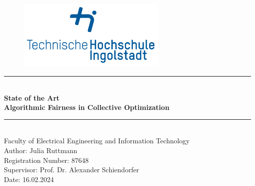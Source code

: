 \documentclass[german, a4paper, 11pt, oneside]{scrbook}
\begin{document}
\thispagestyle{empty}
\begin{figure}[t]
 \centering
 \includegraphics[height=3.4cm, trim=1.2cm 1.2cm 1.2cm 1.2cm]{thi_logo}
\end{figure}
\begin{center}
\vspace*{2cm}

\vspace*{2cm}
\par\noindent\rule{\textwidth}{0.2pt}
\\
\vspace*{0.5cm}
{\huge \textbf{State of the Art}}\\
{\LARGE \textbf{Algorithmic Fairness in Collective Optimization}}
\par\noindent\rule{\textwidth}{0.2pt}
\\
\vspace*{2cm}
{\huge Faculty of Electrical Engineering and Information Technology}
\\
\vspace*{2cm}
{\LARGE Author: Julia Ruttmann \\Registration Number: 87648\\Supervisor: Prof. Dr. Alexander Schiendorfer\\}
\vspace*{0.4cm}
{\LARGE Date: 16.02.2024}

\end{center}
\newpage
\tableofcontents
\thispagestyle{empty}
\newpage
\setcounter{page}{1}
\end{document}
